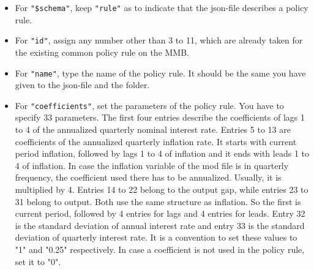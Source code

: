 \begin{itemize}
%
\item For \texttt{"\$schema"}, keep \texttt{"rule"} as to indicate that the json-file describes a policy rule.
\item For \texttt{"id"}, assign any number other than 3 to 11, which are already taken for the existing common policy rule on the MMB.
\item For \texttt{"name"}, type the name of the policy rule. It should be the same you have given to the json-file and the folder.
\item For \texttt{"coefficients"}, set the parameters of the policy rule. 
You have to specify 33 parameters.
	The first four entries describe the coefficients of lags 1 to 4 of the annualized quarterly nominal interest rate.
	Entries 5 to 13 are coefficients of the annualized quarterly inflation rate. It starts with current period inflation, followed by lags 1 to 4 of inflation and it ends with leads 1 to 4 of inflation. In case the inflation variable of the mod file is in quarterly frequency, the coefficient used there has to be annualized. Usually, it is multiplied by 4.
	Entries 14 to 22 belong to the output gap, while entries 23 to 31 belong to output. Both use the same structure as inflation. So the first is current period, followed by 4 entries for lags and 4 entries for leads.
	Entry 32 is the standard deviation of annual interest rate and entry 33 is the standard deviation of quarterly interest rate. It is a convention to set these values to "1" and "0.25" respectively.   
	In case a coefficient is not used in the policy rule, set it to "0".

\end{itemize}
